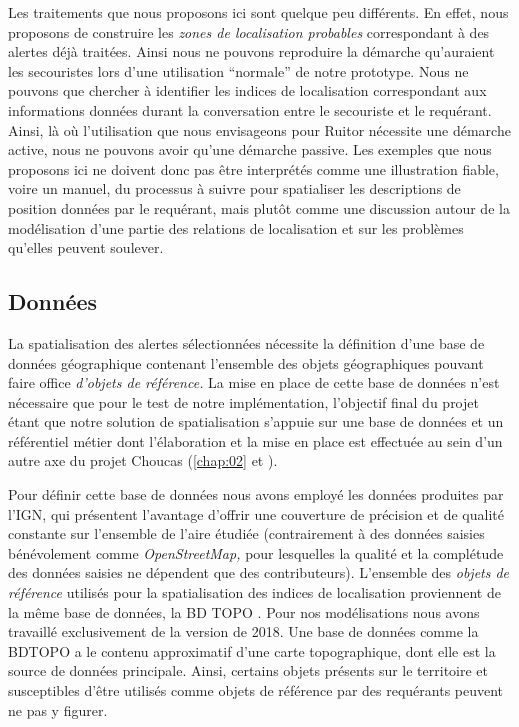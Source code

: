 Les traitements que nous proposons ici sont quelque peu différents. En
effet, nous proposons de construire les \emph{zones de localisation
  probables} correspondant à des alertes déjà traitées. Ainsi nous ne
pouvons reproduire la démarche qu'auraient les secouristes lors d'une
utilisation \enquote{normale} de notre prototype. Nous ne pouvons que
chercher à identifier les indices de localisation correspondant aux
informations données durant la conversation entre le secouriste et le
requérant. Ainsi, là où l'utilisation que nous envisageons pour Ruitor
nécessite une démarche active, nous ne pouvons avoir qu'une démarche
passive. Les exemples que nous proposons ici ne doivent donc pas être
interprétés comme une illustration fiable, voire un manuel, du
processus à suivre pour spatialiser les descriptions de position
données par le requérant, mais plutôt comme une discussion autour de
la modélisation d'une partie des relations de localisation et sur les
problèmes qu'elles peuvent soulever.

\subsection{Données}

La spatialisation des alertes sélectionnées nécessite la définition
d'une base de données géographique contenant l'ensemble des objets
géographiques pouvant faire office \emph{d'objets de référence.} La
mise en place de cette base de données n'est nécessaire que pour le
test de notre implémentation, l'objectif final du projet étant que
notre solution de spatialisation s'appuie sur une base de données et
un référentiel métier dont l’élaboration et la mise en place est
effectuée au sein d'un autre axe du projet Choucas (\autoref{chap:02}
et \cite{VanDamme2019}).

Pour définir cette base de données nous avons employé les données
produites par l'IGN, qui présentent l'avantage d'offrir une couverture
de précision et de qualité constante sur l'ensemble de l'aire étudiée
(contrairement à des données saisies bénévolement comme
\emph{OpenStreetMap,} pour lesquelles la qualité et la complétude des
données saisies ne dépendent que des contributeurs). L'ensemble des
\emph{objets de référence} utilisés pour la spatialisation des indices
de localisation proviennent de la même base de données, la BD TOPO
\autocite{IGN2020}. Pour nos modélisations nous avons travaillé
exclusivement de la version de 2018. Une base de données comme la
BDTOPO a le contenu approximatif d'une carte topographique, dont elle
est la source de données principale. Ainsi, certains objets présents
sur le territoire et susceptibles d'être utilisés comme objets de
référence par des requérants peuvent ne pas y figurer.

